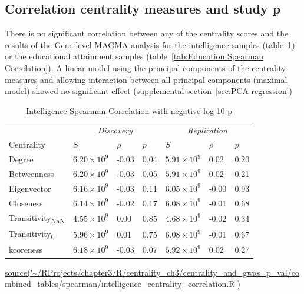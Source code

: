 \subsection{Correlation centrality measures and study p}
\label{sec:correlation centrality measures and study p}
There is no significant correlation between any of the centrality scores and the results of the Gene level MAGMA analysis for the intelligence samples (table~\ref{tab:Intelligence Spearman Correlation}) or the educational attainment samples (table~\ref{tab:Education Spearman Correlation}). A linear model using the principal components of the centrality measures and allowing interaction between all principal components (maximal model) showed no significant effect (supplemental section~\ref{sec:PCA regression})




\begin{table}[ht]
\centering
\setlength{\extrarowheight}{2pt}
\begin{tabular}{l@{\hskip 20pt}lll@{\hskip 20pt}lll}
  \toprule
  &  \multicolumn{3}{c}{\textit{Discovery}} & \multicolumn{3}{c}{\textit{Replication}} \\
  \cmidrule{2-7}
Centrality & $S$ & $\rho$ & $p$ & $S$ & $\rho$ & $p$ \\ 
  \midrule
Degree & $6.20 \times 10^{9}$ & -0.03 & 0.04 & $5.91 \times 10^{9}$ & 0.02 & 0.20 \\ 
  Betweenness & $6.20 \times 10^{9}$ & -0.03 & 0.05 & $5.91 \times 10^{9}$ & 0.02 & 0.21 \\ 
  Eigenvector & $6.16 \times 10^{9}$ & -0.03 & 0.11 & $6.05 \times 10^{9}$ & -0.00 & 0.93 \\ 
  Closeness & $6.14 \times 10^{9}$ & -0.02 & 0.17 & $6.08 \times 10^{9}$ & -0.01 & 0.68 \\ 
  Transitivity\textsubscript{NaN} & $4.55 \times 10^{9}$ & 0.00 & 0.85 & $4.68 \times 10^{9}$ & -0.02 & 0.34 \\ 
  Transitivity\textsubscript{0} & $5.96 \times 10^{9}$ & 0.01 & 0.75 & $6.08 \times 10^{9}$ & -0.01 & 0.67 \\ 
  kcoreness & $6.18 \times 10^{9}$ & -0.03 & 0.07 & $5.92 \times 10^{9}$ & 0.02 & 0.27 \\ 
   \bottomrule
\end{tabular}
\caption{Intelligence Spearman Correlation with negative log 10 p } 
\tiny\url{source('~/RProjects/chapter3/R/centrality_ch3/centrality_and_gwas_p_val/combined_tables/spearman/intelligence_centrality_correlation.R')}
\label{tab:Intelligence Spearman Correlation}
\end{table}

